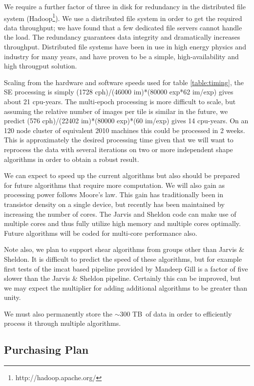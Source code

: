\documentclass[12pt]{article}
\newcommand{\diskredapprox}{$\sim$300 TB}
\begin{document}
We require a further factor of three in disk for redundancy in the distributed
file system (Hadoop\footnote{http://hadoop.apache.org/}).   We use a
distributed file system in order to get the required data throughput; we have
found that a few dedicated file servers cannot handle the load. The redundancy
guarantees data integrity and dramatically increases throughput.  Distributed
file systems have been in use in high energy physics and industry for many
years, and have proven to be a simple, high-availability and high througput
solution.

Scaling from the hardware and software speeds used for table
\ref{table:timing}, the SE processing is simply (1728 cph)/(46000 im)*(80000
exp*62 im/exp) gives about 21 cpu-years.  The multi-epoch processing is more
difficult to scale, but assuming the relative number of images per tile is
similar in the future, we predict (576 cph)/(22402 im)*(80000 exp)*(60 im/exp)
gives 14 cpu-years.  On an 120 node cluster of equivalent 2010 machines this
could be processed in 2 weeks.  This is approximately the desired processing
time given that we will want to reprocess the data with several iterations on
two or more independent shape algorithms in order to obtain a robust result.

We can expect to speed up the current algorithms but also should be prepared
for future algorithms that require more computation.  We will also gain as
processing power follows Moore's law. This gain has traditionally been in
transistor density on a single device, but recently has been maintained by
increasing the number of cores.  The Jarvis and Sheldon code can make use of
multiple cores and thus fully utilize high memory and multiple cores optimally.
Future algorithms will be coded for multi-core performance also.

Note also, we plan to support shear algorithms from groups other than Jarvis \&
Sheldon.  It is difficult to predict the speed of these algorithms, but for
example first tests of the imcat based pipeline provided by Mandeep Gill is a
factor of five slower than the Jarvis \& Sheldon pipeline.  Certainly this can
be improved, but we may expect the multiplier for adding additional algorithms
to be greater than unity.

We must also permanently store the \diskredapprox\ of data in order to efficiently
process it through multiple algorithms.  

\subsection{Purchasing Plan}
\end{document}
